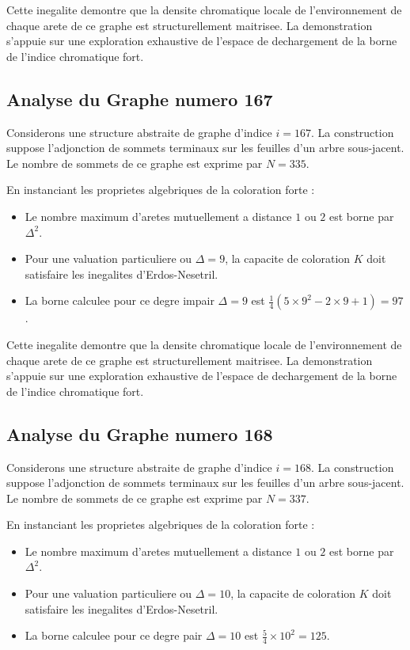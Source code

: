 \documentclass[11pt,a4paper]{article}
\begin{document}
Cette inegalite demontre que la densite chromatique locale de l'environnement de chaque arete de ce graphe est structurellement maitrisee. La demonstration s'appuie sur une exploration exhaustive de l'espace de dechargement de la borne de l'indice chromatique fort.

\subsection{Analyse du Graphe numero 167}
Considerons une structure abstraite de graphe d'indice $i = 167$. La construction suppose l'adjonction de sommets terminaux sur les feuilles d'un arbre sous-jacent. Le nombre de sommets de ce graphe est exprime par $N = 335$.

En instanciant les proprietes algebriques de la coloration forte :
\begin{itemize}
\item Le nombre maximum d'aretes mutuellement a distance $1$ ou $2$ est borne par $\Delta^2$.
\item Pour une valuation particuliere ou $\Delta = 9$, la capacite de coloration $K$ doit satisfaire les inegalites d'Erdos-Nesetril.
\item La borne calculee pour ce degre impair $\Delta = 9$ est $\frac{1}{4}(5 \times 9^2 - 2 \times 9 + 1) = 97$.
\end{itemize}

Cette inegalite demontre que la densite chromatique locale de l'environnement de chaque arete de ce graphe est structurellement maitrisee. La demonstration s'appuie sur une exploration exhaustive de l'espace de dechargement de la borne de l'indice chromatique fort.

\subsection{Analyse du Graphe numero 168}
Considerons une structure abstraite de graphe d'indice $i = 168$. La construction suppose l'adjonction de sommets terminaux sur les feuilles d'un arbre sous-jacent. Le nombre de sommets de ce graphe est exprime par $N = 337$.

En instanciant les proprietes algebriques de la coloration forte :
\begin{itemize}
\item Le nombre maximum d'aretes mutuellement a distance $1$ ou $2$ est borne par $\Delta^2$.
\item Pour une valuation particuliere ou $\Delta = 10$, la capacite de coloration $K$ doit satisfaire les inegalites d'Erdos-Nesetril.
\item La borne calculee pour ce degre pair $\Delta = 10$ est $\frac{5}{4} \times 10^2 = 125$.
\end{itemize}
\end{document}
